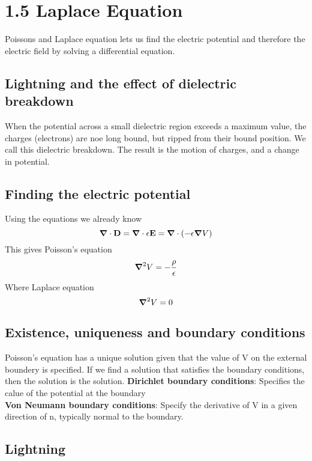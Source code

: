 \documentclass[
12pt, reprint, aip, onecolumn, notitlepage
]{revtex4-1}
\begin{document}
\section{1.5 Laplace Equation}
Poissons and Laplace equation lets us find the electric potential and therefore the electric field by solving a differential equation. 

\subsection{Lightning and the effect of dielectric breakdown}
When the potential across a small dielectric region exceeds a maximum value, the charges (electrons) are noe long bound, but ripped from their bound position. We call this dielectric breakdown. The result is the motion of charges, and a change in potential. 
\subsection{Finding the electric potential}
Using the equations we already know
\begin{equation}
	\grad \cdot \mathbf{D} = \grad \cdot \epsilon \mathbf{E} = \grad \cdot (-\epsilon \grad{V})
\end{equation}
This gives Poisson's equation
\begin{equation}
	\grad^2V = -\dfrac{\rho}{\epsilon}
\end{equation}
Where Laplace equation
\begin{equation}
	\grad^2V = 0
\end{equation}

\subsection*{Existence, uniqueness and boundary conditions}
Poisson's equation has a unique solution given that the value of V on the external boundery is specified. If we find a solution that satisfies the boundary conditions, then the solution is the solution. 
\textbf{Dirichlet boundary conditions}: Specifies the calue of the potential at the boundary\\
\textbf{Von Neumann boundary conditions}: Specify the derivative of V in a given direction of n, typically normal to the boundary. 

\subsection*{Lightning}
\end{document}
